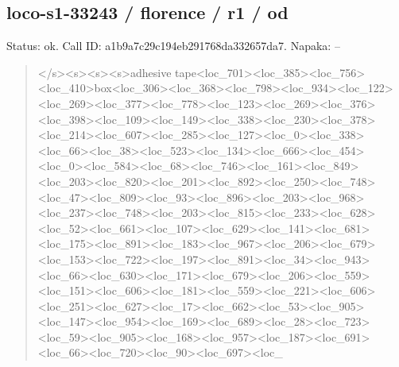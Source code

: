 \documentclass[10pt,a4paper]{article}
\begin{document}
\subsection*{loco-s1-33243 / florence / r1 / od}
Status: ok. Call ID: a1b9a7c29c194eb291768da332657da7. Napaka: --
\begin{quote}\footnotesize
</s>\allowbreak{}<s>\allowbreak{}<s>\allowbreak{}<s>\allowbreak{}adhesive tape<loc\_701>\allowbreak{}<loc\_385>\allowbreak{}<loc\_756>\allowbreak{}<\allowbreak{}loc\_410>\allowbreak{}box<loc\_306>\allowbreak{}<loc\_368>\allowbreak{}<lo\allowbreak{}c\_798>\allowbreak{}<loc\_934>\allowbreak{}<loc\_122>\allowbreak{}<loc\_269\allowbreak{}>\allowbreak{}<loc\_377>\allowbreak{}<loc\_778>\allowbreak{}<loc\_123>\allowbreak{}<loc\allowbreak{}\_269>\allowbreak{}<loc\_376>\allowbreak{}<loc\_398>\allowbreak{}<loc\_109>\allowbreak{}\allowbreak{}<loc\_149>\allowbreak{}<loc\_338>\allowbreak{}<loc\_230>\allowbreak{}<loc\_\allowbreak{}378>\allowbreak{}<loc\_214>\allowbreak{}<loc\_607>\allowbreak{}<loc\_285>\allowbreak{}<\allowbreak{}loc\_127>\allowbreak{}<loc\_0>\allowbreak{}<loc\_338>\allowbreak{}<loc\_66>\allowbreak{}\allowbreak{}<loc\_38>\allowbreak{}<loc\_523>\allowbreak{}<loc\_134>\allowbreak{}<loc\_6\allowbreak{}66>\allowbreak{}<loc\_454>\allowbreak{}<loc\_0>\allowbreak{}<loc\_584>\allowbreak{}<loc\allowbreak{}\_68>\allowbreak{}<loc\_746>\allowbreak{}<loc\_161>\allowbreak{}<loc\_849>\allowbreak{}<\allowbreak{}loc\_203>\allowbreak{}<loc\_820>\allowbreak{}<loc\_201>\allowbreak{}<loc\_8\allowbreak{}92>\allowbreak{}<loc\_250>\allowbreak{}<loc\_748>\allowbreak{}<loc\_47>\allowbreak{}<lo\allowbreak{}c\_809>\allowbreak{}<loc\_93>\allowbreak{}<loc\_896>\allowbreak{}<loc\_203>\allowbreak{}\allowbreak{}<loc\_968>\allowbreak{}<loc\_237>\allowbreak{}<loc\_748>\allowbreak{}<loc\_\allowbreak{}203>\allowbreak{}<loc\_815>\allowbreak{}<loc\_233>\allowbreak{}<loc\_628>\allowbreak{}<\allowbreak{}loc\_52>\allowbreak{}<loc\_661>\allowbreak{}<loc\_107>\allowbreak{}<loc\_62\allowbreak{}9>\allowbreak{}<loc\_141>\allowbreak{}<loc\_681>\allowbreak{}<loc\_175>\allowbreak{}<lo\allowbreak{}c\_891>\allowbreak{}<loc\_183>\allowbreak{}<loc\_967>\allowbreak{}<loc\_206\allowbreak{}>\allowbreak{}<loc\_679>\allowbreak{}<loc\_153>\allowbreak{}<loc\_722>\allowbreak{}<loc\allowbreak{}\_197>\allowbreak{}<loc\_891>\allowbreak{}<loc\_34>\allowbreak{}<loc\_943>\allowbreak{}<\allowbreak{}loc\_66>\allowbreak{}<loc\_630>\allowbreak{}<loc\_171>\allowbreak{}<loc\_67\allowbreak{}9>\allowbreak{}<loc\_206>\allowbreak{}<loc\_559>\allowbreak{}<loc\_151>\allowbreak{}<lo\allowbreak{}c\_606>\allowbreak{}<loc\_181>\allowbreak{}<loc\_559>\allowbreak{}<loc\_221\allowbreak{}>\allowbreak{}<loc\_606>\allowbreak{}<loc\_251>\allowbreak{}<loc\_627>\allowbreak{}<loc\allowbreak{}\_17>\allowbreak{}<loc\_662>\allowbreak{}<loc\_53>\allowbreak{}<loc\_905>\allowbreak{}<l\allowbreak{}oc\_147>\allowbreak{}<loc\_954>\allowbreak{}<loc\_169>\allowbreak{}<loc\_68\allowbreak{}9>\allowbreak{}<loc\_28>\allowbreak{}<loc\_723>\allowbreak{}<loc\_59>\allowbreak{}<loc\_\allowbreak{}905>\allowbreak{}<loc\_168>\allowbreak{}<loc\_957>\allowbreak{}<loc\_187>\allowbreak{}<\allowbreak{}loc\_691>\allowbreak{}<loc\_66>\allowbreak{}<loc\_720>\allowbreak{}<loc\_90\allowbreak{}>\allowbreak{}<loc\_697>\allowbreak{}<loc\_
\end{quote}
\end{document}
